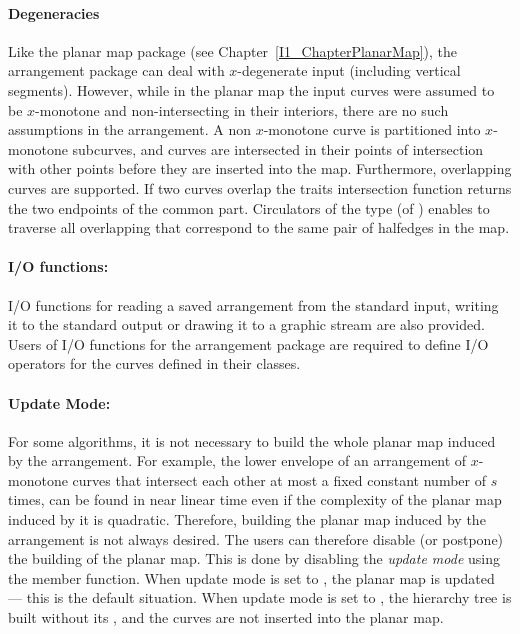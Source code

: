 \paragraph{Degeneracies} Like the planar map package (see
Chapter~\ref{I1_ChapterPlanarMap}), the arrangement package can deal
with $x$-degenerate input (including vertical segments). However,
while in the planar map the input curves were assumed to be
$x$-monotone and non-intersecting in their interiors, there are no
such assumptions in the arrangement. A non $x$-monotone curve is
partitioned into $x$-monotone subcurves, and curves are intersected in
their points of intersection with other points before they are
inserted into the map. Furthermore, overlapping curves are
supported. If two curves overlap the traits intersection function
returns the two endpoints of the common part. Circulators of the
 type (of 
) enables to traverse all
overlapping  that correspond to the same pair of
halfedges in the map.

\paragraph{I/O functions:}
I/O functions for reading a saved arrangement from the standard input, 
writing it to the standard output or drawing it to a graphic stream are 
also provided.
Users of I/O functions for the arrangement package are required to define I/O 
operators for the curves defined in their  classes.

\paragraph{Update Mode:} For some algorithms, it is not necessary to build
the whole planar map induced by the arrangement. For example, the lower
envelope of an arrangement of $x$-monotone curves that intersect
each other at most a fixed constant number of $s$ times,
can be found in near linear time \cite{sa-dsstg-95, h-a-97}
even if
the complexity of the planar map induced by it is quadratic.
Therefore, building the planar map induced by the arrangement is not
always desired. The users can therefore disable (or postpone) the building
of the planar map. This is done by disabling the {\it update mode}
using the  member function. When update mode is
set to , the planar map is updated --- this is the
default situation. 
When update mode is set to , the hierarchy tree is built without
its , and the curves are not inserted into the planar map.

